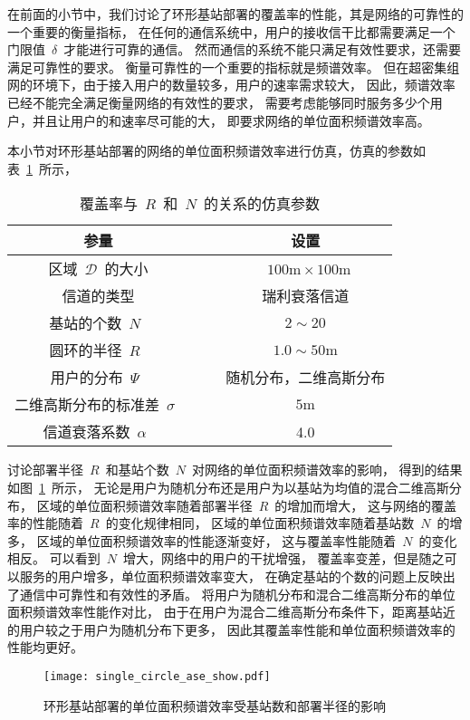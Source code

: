 
在前面的小节中，我们讨论了环形基站部署的覆盖率的性能，其是网络的可靠性的一个重要的衡量指标，
在任何的通信系统中，用户的接收信干比都需要满足一个门限值~$\delta$~才能进行可靠的通信。
然而通信的系统不能只满足有效性要求，还需要满足可靠性的要求。
衡量可靠性的一个重要的指标就是频谱效率。
但在超密集组网的环境下，由于接入用户的数量较多，用户的速率需求较大，
因此，频谱效率已经不能完全满足衡量网络的有效性的要求，
需要考虑能够同时服务多少个用户，并且让用户的和速率尽可能的大，
即要求网络的单位面积频谱效率高。

本小节对环形基站部署的网络的单位面积频谱效率进行仿真，仿真的参数如表~\ref{single_circle_ase_para}~所示，
\begin{table}[htbp]
\caption{覆盖率与~$R$~和~$N$~的关系的仿真参数}
\label{single_circle_ase_para}
\vspace{0.5em}\centering\wuhao
\begin{tabular}{cccc}
\toprule[1.5pt]
参量 & & & 设置 \\
\midrule[0.5pt]
区域~$\mathcal{D}$~的大小  & & & ~$100\mathrm{m} \times 100 \mathrm{m}$ \\
信道的类型 & & &  瑞利衰落信道\\
基站的个数~$N$~ & & &  $2\sim20$\\
圆环的半径~$R$~ & & &  $1.0\sim 50\mathrm{m}$\\
用户的分布~$\Psi$~ & & & 随机分布，二维高斯分布\\
二维高斯分布的标准差~$\sigma$~ & & & ${5\mathrm{m}}$\\
信道衰落系数~$\alpha$~  & & & 4.0\\
\bottomrule[1.5pt]
\end{tabular}
\end{table}
讨论部署半径~$R$~和基站个数~$N$~对网络的单位面积频谱效率的影响，
得到的结果如图~\ref{single_circle_ase_show}~所示，
无论是用户为随机分布还是用户为以基站为均值的混合二维高斯分布，
区域的单位面积频谱效率随着部署半径~$R$~的增加而增大，
这与网络的覆盖率的性能随着~$R$~的变化规律相同，
区域的单位面积频谱效率随着基站数~$N$~的增多，
区域的单位面积频谱效率的性能逐渐变好，
这与覆盖率性能随着~$N$~的变化相反。
可以看到~$N$~增大，网络中的用户的干扰增强，
覆盖率变差，但是随之可以服务的用户增多，单位面积频谱效率变大，
在确定基站的个数的问题上反映出了通信中可靠性和有效性的矛盾。
将用户为随机分布和混合二维高斯分布的单位面积频谱效率性能作对比，
由于在用户为混合二维高斯分布条件下，距离基站近的用户较之于用户为随机分布下更多，
因此其覆盖率性能和单位面积频谱效率的性能均更好。
\begin{figure}[htbp]
\centering
\texttt{[image: single\_circle\_ase\_show.pdf]}
\caption{环形基站部署的单位面积频谱效率受基站数和部署半径的影响}\vspace{-0.5em}
\label{single_circle_ase_show}
\end{figure}

